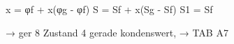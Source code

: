 x = φf + x(φg - φf)  
S = Sf + x(Sg - Sf)  
S1 = Sf  

→ ger 8 Zustand 4 gerade kondenswert,  
→ TAB A7